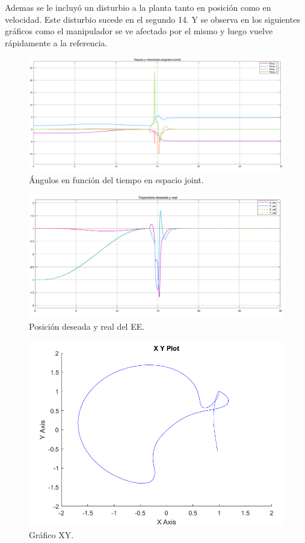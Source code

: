 Ademas se le incluy\'o un disturbio a la planta tanto en posici\'on como en velocidad. Este disturbio sucede en el segundo 14. Y se observa en los siguientes gráficos como el manipulador se ve afectado por el mismo y luego vuelve rápidamente a la referencia.

\begin{figure}[H]
	\centering
	\includegraphics[width=0.8\linewidth]{ImagenesControl de posición no lineal/1_3_e_a}
	\caption{\'Angulos en funci\'on del tiempo en espacio joint.}	
	\label{fig:athetasd}
\end{figure}

\begin{figure}[H]
	\centering
	\includegraphics[width=0.8\linewidth]{ImagenesControl de posición no lineal/1_3_e_b}
	\caption{Posici\'on deseada y real del EE.}	
	\label{fig:aposd}
\end{figure}
\begin{figure}[H]
	\centering
	\includegraphics[width=0.5\linewidth]{ImagenesControl de posición no lineal/1_3_e_c}
	\caption{Gr\'afico XY.}	
	\label{fig:axyd}
\end{figure}

%
